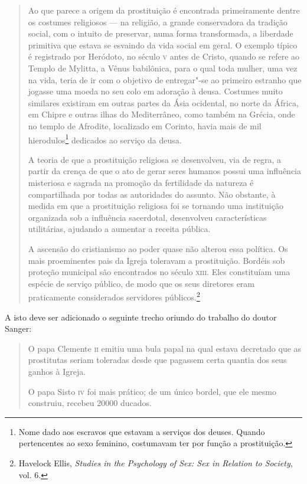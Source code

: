 \begin{quote}
Ao que parece a origem da prostituição é encontrada
primeiramente dentre os costumes religiosos --- na religião, a grande
conservadora da tradição social, com o intuito de preservar, numa forma transformada, a
liberdade primitiva que estava se esvaindo da vida social em geral. O
exemplo típico é registrado por Heródoto, no século \textsc{v} antes de Cristo,
quando se refere ao Templo de Mylitta, a Vênus babilônica, para o qual toda mulher,
uma vez na vida, teria de ir com o objetivo de entregar"-se ao primeiro estranho que jogasse uma
moeda no seu colo em adoração à deusa. Costumes muito similares
existiram em outras partes da Ásia ocidental, no norte da África, em
Chipre e outras ilhas do Mediterrâneo, como também na Grécia, onde no
templo de Afrodite, localizado em Corinto, havia mais de mil
hierodulos\footnote{Nome dado aos escravos que estavam a serviços dos
  deuses. Quando pertencentes ao sexo feminino, costumavam
  ter por função a prostituição.}
dedicados ao serviço da deusa.

A teoria de que a prostituição religiosa se desenvolveu, via de regra,
a partir da crença de que o ato de gerar seres humanos possui uma
influência misteriosa e sagrada na promoção da fertilidade da natureza
é compartilhada por todas as autoridades do assunto. Não obstante, à
medida em que a prostituição religiosa foi se tornando uma instituição
organizada sob a influência sacerdotal, desenvolveu características
utilitárias, ajudando a aumentar a receita pública.

A ascensão do cristianismo ao poder quase não
alterou essa política. Os mais proeminentes pais da Igreja toleravam a
prostituição. Bordéis sob proteção municipal são encontrados no século
\textsc{xiii}. Eles constituíam uma espécie de serviço público, de modo que os
seus diretores eram praticamente considerados servidores
públicos.\footnote{Havelock Ellis,
  \emph{Studies in the Psychology of Sex: Sex in Relation to Society},
  vol. 6.}
  \end{quote}

A isto deve ser adicionado o seguinte trecho oriundo do trabalho do
doutor Sanger:

\begin{quote}
O papa Clemente \textsc{ii} emitiu uma bula papal na qual estava decretado que
as prostitutas seriam toleradas desde que pagassem certa quantia dos
seus ganhos à Igreja.

O papa Sisto \textsc{iv} foi mais prático; de um único bordel, que ele mesmo
construiu, recebeu 20000 ducados.
\end{quote}

